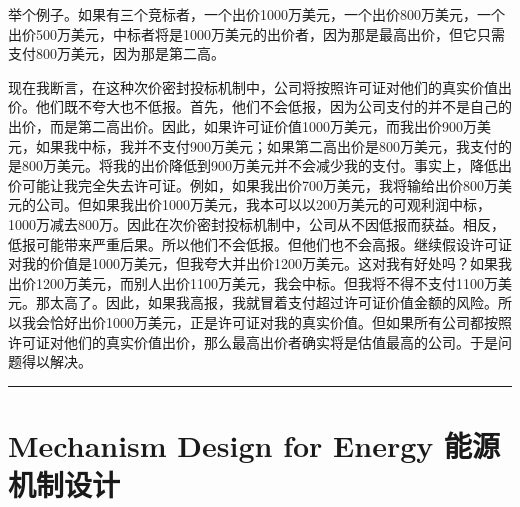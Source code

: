 \documentclass[12pt,a4paper]{article}
\newenvironment{translation}{%
  \par\vspace{2pt}\noindent%
  \color{transblue}%
  \ignorespaces
}{%
  \par\vspace{4pt}\hrule\vspace{6pt}%
}
\begin{document}
\begin{translation}
举个例子。如果有三个竞标者，一个出价1000万美元，一个出价800万美元，一个出价500万美元，中标者将是1000万美元的出价者，因为那是最高出价，但它只需支付800万美元，因为那是第二高。

现在我断言，在这种次价密封投标机制中，公司将按照许可证对他们的真实价值出价。他们既不夸大也不低报。首先，他们不会低报，因为公司支付的并不是自己的出价，而是第二高出价。因此，如果许可证价值1000万美元，而我出价900万美元，如果我中标，我并不支付900万美元；如果第二高出价是800万美元，我支付的是800万美元。将我的出价降低到900万美元并不会减少我的支付。事实上，降低出价可能让我完全失去许可证。例如，如果我出价700万美元，我将输给出价800万美元的公司。但如果我出价1000万美元，我本可以以200万美元的可观利润中标，1000万减去800万。因此在次价密封投标机制中，公司从不因低报而获益。相反，低报可能带来严重后果。所以他们不会低报。但他们也不会高报。继续假设许可证对我的价值是1000万美元，但我夸大并出价1200万美元。这对我有好处吗？如果我出价1200万美元，而别人出价1100万美元，我会中标。但我将不得不支付1100万美元。那太高了。因此，如果我高报，我就冒着支付超过许可证价值金额的风险。所以我会恰好出价1000万美元，正是许可证对我的真实价值。但如果所有公司都按照许可证对他们的真实价值出价，那么最高出价者确实将是估值最高的公司。于是问题得以解决。
\end{translation}

\section{Mechanism Design for Energy \hfill 能源机制设计}
\end{document}
